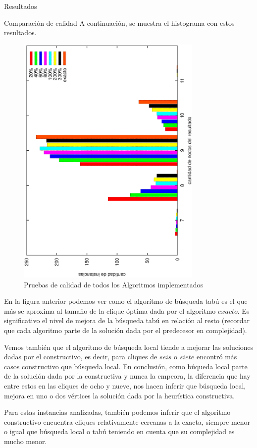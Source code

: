 \documentclass[12pt,titlepage]{article}
\begin{document}
\begin{section}{Resultados}
\begin{subsection}{Comparación de calidad}
		A continuación, se muestra el histograma con estos resultados.
		\begin{figure}[H]
			\centering
					\includegraphics[width=9cm,angle=-90]{conclusiones/calidad.eps}
			\caption{Pruebas de calidad de todos los Algoritmos implementados}
			\label{fig:Calidad de los Algoritmos}
		\end{figure}
		
		En la figura anterior podemos ver como el algorítmo de búsqueda tabú es el que más se aproxima al tamaño de la clique óptima dada por el algoritmo $exacto$. Es significativo el nivel de mejora de la búsqueda tabú en relación al resto (recordar que cada algoritmo parte de la solución dada por el predecesor en complejidad).
		
		Vemos también que el algoritmo de búsqueda local tiende a mejorar las soluciones dadas por el constructivo, es decir, para cliques de $seis$ o $siete$ encontró más casos constructivo que búsqueda local. En conclusión, como búqueda local parte de la solución dada por la constructiva y nunca la empeora, la diferencia que hay entre estos en las cliques de ocho y nueve, nos hacen inferir que búsqueda local, mejora en uno o dos vértices la solución dada por la heurística constructiva.
		
		Para estas instancias analizadas, también podemos inferir que el algoritmo constructivo encuentra cliques relativamente cercanas a la exacta, siempre menor o igual que búsqueda local o tabú teniendo en cuenta que su complejidad es mucho menor.
		

\end{subsection}
\end{section}
\end{document}
